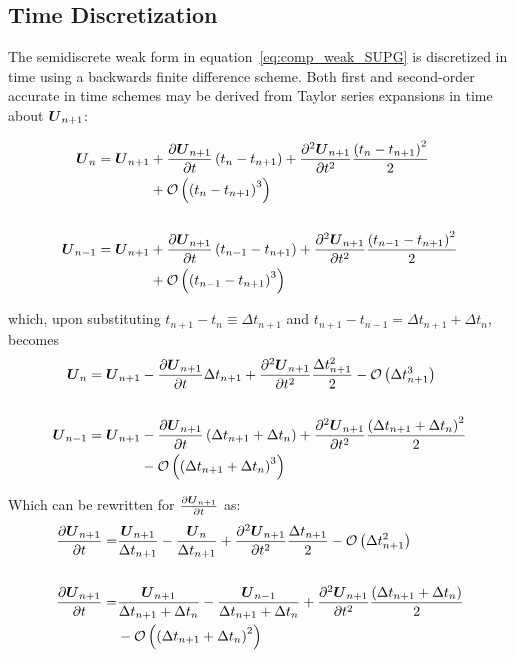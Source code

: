 \documentclass[compress,11pt]{beamer}
\begin{document}
\subsection{Time Discretization}
\frame
{
  \scriptsize
  The semidiscrete weak form in equation~\eqref{eq:comp_weak_SUPG} is discretized in time using a backwards finite difference scheme.  Both first and second-order accurate in time schemes may be derived from Taylor series expansions in time about ${\boldsymbol{U}}_{n+1}$:
  
  {
    \begin{align}
      {\boldsymbol{U}}_n     = {\boldsymbol{U}}_{n+1} &+ {\frac{\partial{{\boldsymbol{U}}_{n+1}}}{\partial{t}}}\left(t_n-t_{n+1}\right) + {\frac{{\partial}^2{{\boldsymbol{U}}_{n+1}}}{\partial{t}^2}}\frac{\left(t_n-t_{n+1}\right)^2}{2} \nonumber \\
      &+ \mathcal{O}\left(\left(t_n-t_{n+1}\right)^3\right) \nonumber \\
      & \nonumber \\
      {\boldsymbol{U}}_{n-1} = {\boldsymbol{U}}_{n+1} &+ {\frac{\partial{{\boldsymbol{U}}_{n+1}}}{\partial{t}}}\left(t_{n-1}-t_{n+1}\right) + {\frac{{\partial}^2{{\boldsymbol{U}}_{n+1}}}{\partial{t}^2}}\frac{\left(t_{n-1}-t_{n+1}\right)^2}{2} \nonumber \\
      &+ \mathcal{O}\left(\left(t_{n-1}-t_{n+1}\right)^3\right) \nonumber
    \end{align}
  }
      
  {
    which, upon substituting $t_{n+1} - t_n\equiv\Delta t_{n+1}$ and $t_{n+1} - t_{n-1}=\Delta t_{n+1} + \Delta t_n$, becomes
    \begin{align}
      {\boldsymbol{U}}_n     = {\boldsymbol{U}}_{n+1} &- {\frac{\partial{{\boldsymbol{U}}_{n+1}}}{\partial{t}}}\Delta t_{n+1} + {\frac{{\partial}^2{{\boldsymbol{U}}_{n+1}}}{\partial{t}^2}}\frac{\Delta t_{n+1}^2}{2} - \mathcal{O}\left(\Delta t_{n+1}^3\right) \nonumber \\ 
      & \nonumber \\
      {\boldsymbol{U}}_{n-1} = {\boldsymbol{U}}_{n+1} &- {\frac{\partial{{\boldsymbol{U}}_{n+1}}}{\partial{t}}}\left(\Delta t_{n+1}+\Delta t_n\right) + {\frac{{\partial}^2{{\boldsymbol{U}}_{n+1}}}{\partial{t}^2}}\frac{\left(\Delta t_{n+1}+\Delta t_n\right)^2}{2} \nonumber \\
      &- \mathcal{O}\left(\left(\Delta t_{n+1}+\Delta t_n\right)^3\right) \nonumber
    \end{align}
  }
}

\frame
{
  \scriptsize
  Which can be rewritten for ${\frac{\partial{{\boldsymbol{U}}_{n+1}}}{\partial{t}}}$ as:
  \begin{align}
    {\frac{\partial{{\boldsymbol{U}}_{n+1}}}{\partial{t}}} = &\frac{{\boldsymbol{U}}_{n+1}}{\Delta t_{n+1}} - \frac{{\boldsymbol{U}}_n}{\Delta t_{n+1}} + {\frac{{\partial}^2{{\boldsymbol{U}}_{n+1}}}{\partial{t}^2}} \frac{\Delta t_{n+1}}{2}
    - \mathcal{O}\left(\Delta t_{n+1}^2\right) \label{eq:udot,un} \\
    & \nonumber \\
    {\frac{\partial{{\boldsymbol{U}}_{n+1}}}{\partial{t}}} = &\frac{{\boldsymbol{U}}_{n+1}}{\Delta t_{n+1} + \Delta t_n} - \frac{{\boldsymbol{U}}_{n-1}}{\Delta t_{n+1} + \Delta t_n} + {\frac{{\partial}^2{{\boldsymbol{U}}_{n+1}}}{\partial{t}^2}}\frac{\left(\Delta t_{n+1} + \Delta t_n\right)}{2} \nonumber \\
    &- \mathcal{O}\left(\left(\Delta t_{n+1} + \Delta t_n\right)^2\right) \label{eq:udot,unm1}
  \end{align}
}
\end{document}
